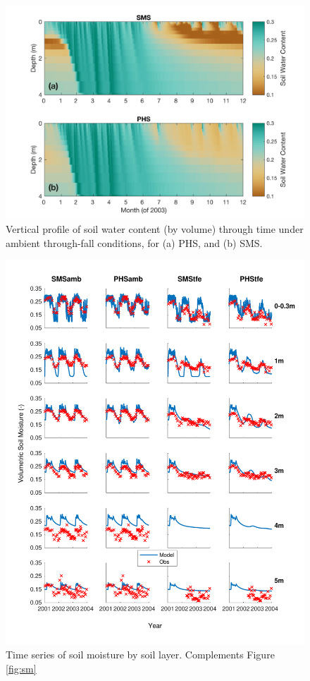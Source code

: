 \documentclass[draft,linenumbers]{agujournal}
\begin{document}
  
        \clearpage
    \begin{figure}[h]
     \centering
     \includegraphics[width=30pc]{../figs3/suppsmp.jpg}
     \caption{Vertical profile of soil water content (by volume) through time under ambient through-fall conditions, for
     (a) PHS, and 
     (b) SMS. }
     \label{supp:sm}
  \end{figure}
  

    \begin{figure}[h]
     \centering
     \includegraphics[width=30pc]{../figs3/suppsm2.pdf}
     \caption{Time series of soil moisture by soil layer.
     Complements Figure \ref{fig:sm}}
     \label{supp:sm2}
  \end{figure}
          \clearpage
          
\end{document}
